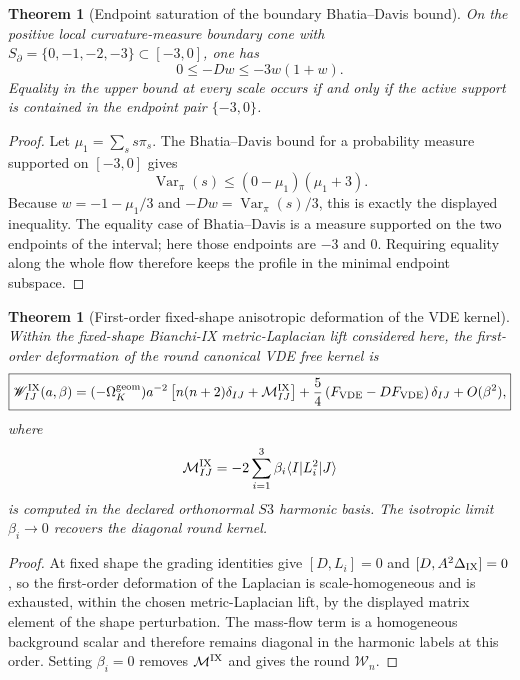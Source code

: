 \documentclass[11pt,a4paper]{article}
\def\Sthree{S3}%
\def\Dil{D}%
\numberwithin{equation}{section}
\theoremstyle{definition}
\theoremstyle{plain}
\newtheorem{theorem}[criterion]{Theorem}
\theoremstyle{remark}
\newcommand{\Sthree}{S^3}
\newcommand{\Dil}{\mathscr{D}}
\begin{document}
\begin{theorem}[Endpoint saturation of the boundary Bhatia--Davis bound]
On the positive local curvature-measure boundary cone with
\(S_\partial=\{0,-1,-2,-3\}\subset[-3,0]\), one has
\begin{equation}
\boxed{
0\le-\Dil w\le -3w(1+w).
}
\end{equation}
Equality in the upper bound at every scale occurs if and only if the active
support is contained in the endpoint pair \(\{-3,0\}\).
\end{theorem}
\begin{proof}
Let \(\mu_1=\sum_s s\pi_s\).  The Bhatia--Davis bound for a probability measure
supported on \([-3,0]\) gives
\begin{equation}
\operatorname{Var}_\pi(s)\le (0-\mu_1)(\mu_1+3).
\end{equation}
Because \(w=-1-\mu_1/3\) and \(-\Dil w=\operatorname{Var}_\pi(s)/3\), this is
exactly the displayed inequality.  The equality case of Bhatia--Davis is a
measure supported on the two endpoints of the interval; here those endpoints
are \(-3\) and \(0\).  Requiring equality along the whole flow therefore keeps
the profile in the minimal endpoint subspace.
\end{proof}

\begin{theorem}[First-order fixed-shape anisotropic deformation of the VDE kernel]
Within the fixed-shape Bianchi-IX metric-Laplacian lift considered here, the
first-order deformation of the round canonical VDE free kernel is
\begin{equation}
\boxed{
\mathscr W_{IJ}^{\rm IX}(a,\beta)=
(-\Omega_K^{\rm geom})a^{-2}
\left[n(n+2)\delta_{IJ}+\mathcal M_{IJ}^{\rm IX}\right]
+\frac54\left(F_{\rm VDE}-\Dil F_{\rm VDE}\right)\delta_{IJ}
+O(\beta^2),
}
\end{equation}
where
\begin{equation}
\mathcal M_{IJ}^{\rm IX}=-2\sum_{i=1}^3\beta_i\langle I|L_i^2|J\rangle
\end{equation}
is computed in the declared orthonormal \(\Sthree\) harmonic basis.  The
isotropic limit \(\beta_i\to0\) recovers the diagonal round kernel.
\end{theorem}
\begin{proof}
At fixed shape the grading identities give \([\Dil,L_i]=0\) and
\([\Dil,A^2\Delta_{\rm IX}]=0\), so the first-order deformation of the Laplacian
is scale-homogeneous and is exhausted, within the chosen metric-Laplacian lift,
by the displayed matrix element of the shape perturbation.  The mass-flow term
is a homogeneous background scalar and therefore remains diagonal in the
harmonic labels at this order.  Setting \(\beta_i=0\) removes
\(\mathcal M^{\rm IX}\) and gives the round \(\mathscr W_n\).
\end{proof}
\end{document}
